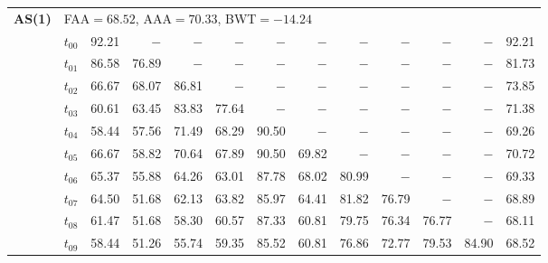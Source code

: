 \begin{table}[ht]
\begin{tabular}{@{}l l r r r r r r r r r r r@{}}
\midrule
\multirow{11}{*}{\textbf{AS(1)}} & \multicolumn{12}{l}{\quad\small FAA$=68.52$,\; AAA$=70.33$,\; BWT$=-14.24$} \\
 & $t_{00}$ & 92.21 & $-$ & $-$ & $-$ & $-$ & $-$ & $-$ & $-$ & $-$ & $-$ & 92.21 \\
 & $t_{01}$ & 86.58 & 76.89 & $-$ & $-$ & $-$ & $-$ & $-$ & $-$ & $-$ & $-$ & 81.73 \\
 & $t_{02}$ & 66.67 & 68.07 & 86.81 & $-$ & $-$ & $-$ & $-$ & $-$ & $-$ & $-$ & 73.85 \\
 & $t_{03}$ & 60.61 & 63.45 & 83.83 & 77.64 & $-$ & $-$ & $-$ & $-$ & $-$ & $-$ & 71.38 \\
 & $t_{04}$ & 58.44 & 57.56 & 71.49 & 68.29 & 90.50 & $-$ & $-$ & $-$ & $-$ & $-$ & 69.26 \\
 & $t_{05}$ & 66.67 & 58.82 & 70.64 & 67.89 & 90.50 & 69.82 & $-$ & $-$ & $-$ & $-$ & 70.72 \\
 & $t_{06}$ & 65.37 & 55.88 & 64.26 & 63.01 & 87.78 & 68.02 & 80.99 & $-$ & $-$ & $-$ & 69.33 \\
 & $t_{07}$ & 64.50 & 51.68 & 62.13 & 63.82 & 85.97 & 64.41 & 81.82 & 76.79 & $-$ & $-$ & 68.89 \\
 & $t_{08}$ & 61.47 & 51.68 & 58.30 & 60.57 & 87.33 & 60.81 & 79.75 & 76.34 & 76.77 & $-$ & 68.11 \\
 & $t_{09}$ & 58.44 & 51.26 & 55.74 & 59.35 & 85.52 & 60.81 & 76.86 & 72.77 & 79.53 & 84.90 & 68.52 \\
\bottomrule
\end{tabular}
\end{table}

